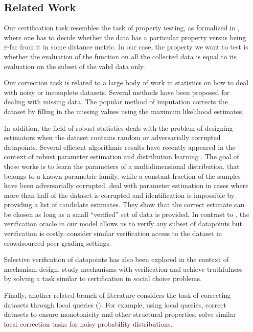 \subsection{Related Work}
Our certification task resembles the task of property testing, as formalized in \cite{GGR96},
where one has to decide whether the data has a particular property versus being $\varepsilon$-far from it in some distance metric. In our case, the property we want to test is whether the evaluation of the function on all the collected data is equal to its evaluation on the subset of the valid data only.

  Our correction task is related to a large body of work in statistics on how to
deal with noisy or incomplete datasets. Several methods have been proposed for dealing with missing data. The popular method of imputation
\cite{Rubin:87,book:imputation,book:incomplete:data} corrects the dataset by filling in the missing values using the
maximum likelihood estimates.

In addition, the field of robust statistics \cite{hampel80, huber11} deals with the problem of designing estimators when the dataset contains random or adversarially corrupted datapoints. Several efficient algorithmic results have recently appeared in the context of robust parameter estimation and distribution learning \cite{DKK+16,DKK+17,DKK+18,DKS17,LRV16}. The goal of these works is to learn the parameters of a multidimensional distribution, that belongs to a known parametric family, while a constant fraction of the samples have been adversarially corrupted.
\cite{CharikarSG17} deal with parameter estimation in cases where more than half of the dataset is corrupted and identification is impossible by providing a list of candidate estimates. They show that the correct estimate can be chosen as long as a small ``verified'' set of data is provided. In contrast to \cite{CharikarSG17}, the verification oracle in our model allows us to verify any subset of datapoints but verification is costly.   
\cite{SVC16} consider similar verification access to the dataset in crowdsourced peer grading settings.

Selective verification of datapoints has also been explored in the context of mechanism design. \cite{FotakisTZ16} study mechanisms with verification and achieve truthfulness by solving a task similar to certification in social choice problems.

Finally, another related branch of literature considers the task of correcting datasets through local queries (\cite{JhaR11,BlumLR90,BhattacharyyaGJJRW12,SacksS10,AilonCCSL08,CanonneGR16}). For example, using local queries, \cite{AilonCCSL08} correct datasets to ensure monotonicity and other structural properties. \cite{CanonneGR16} solve similar local correction tasks for noisy probability distributions. 


